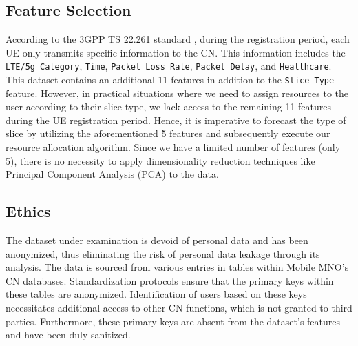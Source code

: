 \documentclass[conference]{IEEEtran}
\begin{document}

\subsection{Feature Selection}
According to the 3GPP TS 22.261 standard \cite{3gpp23ts22261}, during the registration period, each UE only transmits specific information to the CN. This information includes the \texttt{\footnotesize LTE/5g Category}, \texttt{\footnotesize Time}, \texttt{\footnotesize Packet Loss Rate}, \texttt{\footnotesize Packet Delay}, and \texttt{\footnotesize Healthcare}. This dataset contains an additional 11 features in addition to the \texttt{\footnotesize Slice Type} feature. However, in practical situations where we need to assign resources to the user according to their slice type, we lack access to the remaining 11 features during the UE registration period. Hence, it is imperative to forecast the type of slice by utilizing the aforementioned 5 features and subsequently execute our resource allocation algorithm. Since we have a limited number of features (only 5), there is no necessity to apply dimensionality reduction techniques like Principal Component Analysis (PCA) to the data.

\subsection{Ethics}
The dataset under examination is devoid of personal data and has been anonymized, thus eliminating the risk of personal data leakage through its analysis. The data is sourced from various entries in tables within Mobile MNO's CN databases. Standardization protocols ensure that the primary keys within these tables are anonymized. Identification of users based on these keys necessitates additional access to other CN functions, which is not granted to third parties. Furthermore, these primary keys are absent from the dataset’s features and have been duly sanitized.
\end{document}
